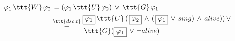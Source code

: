 \documentclass[11pt]{article}
\begin{document}
    $\begin{aligned}
         \varphi_1\,\ttt{W}\,\varphi_2 &\,= (\varphi_1\,\ttt{U}\,\varphi_2)\,\lor\,\ttt{G}\,\varphi_1 \\
         &\overset{\ttt{dsc,t}}{=} \begin{aligned}
                                         &\boxed{\varphi_1}\,\ttt{U}\,(\,\boxed{\varphi_2}\,\land\,(\,\boxed{\varphi_1}\,\lor\,sing)\,\land\,alive))\,\lor\\
                                         &\,\ttt{G}(\boxed{\varphi_1}\,\lor\,\neg alive)
         \end{aligned}
    \end{aligned}$
\end{document}
